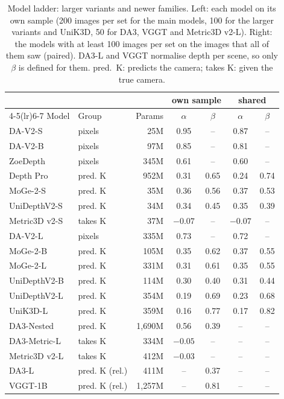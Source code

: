 \begin{table}[t]\centering\small
\caption{Model ladder: larger variants and newer families. Left: each model on its own sample (200 images per set for the main models, 100 for the larger variants and UniK3D, 50 for DA3, VGGT and Metric3D v2-L). Right: the models with at least 100 images per set on the \nLadderShared{} images that all of them saw (paired). DA3-L and VGGT normalise depth per scene, so only $\beta$ is defined for them. pred.\ K: predicts the camera; takes K: given the true camera.}\label{tab:ladder}
\setlength{\tabcolsep}{3pt}
\begin{tabular}{llrcccc}\toprule
& & & \multicolumn{2}{c}{own sample} & \multicolumn{2}{c}{shared} \\ \cmidrule(lr){4-5}\cmidrule(lr){6-7}
Model & Group & Params & $\alpha$ & $\beta$ & $\alpha$ & $\beta$ \\ \midrule
DA-V2-S & pixels & 25M & 0.95 & -- & 0.87 & -- \\
DA-V2-B & pixels & 97M & 0.85 & -- & 0.81 & -- \\
ZoeDepth & pixels & 345M & 0.61 & -- & 0.60 & -- \\
Depth Pro & pred. K & 952M & 0.31 & 0.65 & 0.24 & 0.74 \\
MoGe-2-S & pred. K & 35M & 0.36 & 0.56 & 0.37 & 0.53 \\
UniDepthV2-S & pred. K & 34M & 0.34 & 0.45 & 0.35 & 0.39 \\
Metric3D v2-S & takes K & 37M & \ensuremath{-0.07} & -- & \ensuremath{-0.07} & -- \\
DA-V2-L & pixels & 335M & 0.73 & -- & 0.72 & -- \\
MoGe-2-B & pred. K & 105M & 0.35 & 0.62 & 0.37 & 0.55 \\
MoGe-2-L & pred. K & 331M & 0.31 & 0.61 & 0.35 & 0.55 \\
UniDepthV2-B & pred. K & 114M & 0.30 & 0.40 & 0.31 & 0.44 \\
UniDepthV2-L & pred. K & 354M & 0.19 & 0.69 & 0.23 & 0.68 \\
UniK3D-L & pred. K & 359M & 0.16 & 0.77 & 0.17 & 0.82 \\
DA3-Nested & pred. K & 1,690M & 0.56 & 0.39 & -- & -- \\
DA3-Metric-L & takes K & 334M & \ensuremath{-0.05} & -- & -- & -- \\
Metric3D v2-L & takes K & 412M & \ensuremath{-0.03} & -- & -- & -- \\
DA3-L & pred. K (rel.) & 411M & -- & 0.37 & -- & -- \\
VGGT-1B & pred. K (rel.) & 1,257M & -- & 0.81 & -- & -- \\
\bottomrule\end{tabular}\end{table}

